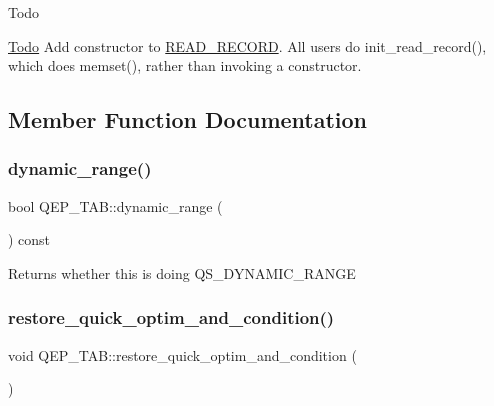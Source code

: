 \begin{DoxyRefDesc}{Todo}
\item[\mbox{\hyperlink{todo__todo000085}{Todo}}]Add constructor to \mbox{\hyperlink{structREAD__RECORD}{R\+E\+A\+D\+\_\+\+R\+E\+C\+O\+RD}}. All users do init\+\_\+read\+\_\+record(), which does memset(), rather than invoking a constructor. \end{DoxyRefDesc}


\subsection{Member Function Documentation}
\mbox{\label{classQEP__TAB_a2174fd8941cd639176550b49e8ebc4fd}} 
\subsubsection{\texorpdfstring{dynamic\+\_\+range()}{dynamic\_range()}}
{\footnotesize\ttfamily bool Q\+E\+P\+\_\+\+T\+A\+B\+::dynamic\+\_\+range (\begin{DoxyParamCaption}{ }\end{DoxyParamCaption}) const\hspace{0.3cm}{\ttfamily [inline]}}

\begin{DoxyReturn}{Returns}
whether this is doing Q\+S\+\_\+\+D\+Y\+N\+A\+M\+I\+C\+\_\+\+R\+A\+N\+GE 
\end{DoxyReturn}
\mbox{\label{classQEP__TAB_aafe7ee2f566e71ae543241e061d5cbe2}} 
\subsubsection{\texorpdfstring{restore\+\_\+quick\+\_\+optim\+\_\+and\+\_\+condition()}{restore\_quick\_optim\_and\_condition()}}
{\footnotesize\ttfamily void Q\+E\+P\+\_\+\+T\+A\+B\+::restore\+\_\+quick\+\_\+optim\+\_\+and\+\_\+condition (\begin{DoxyParamCaption}{ }\end{DoxyParamCaption})\hspace{0.3cm}{\ttfamily [inline]}}

